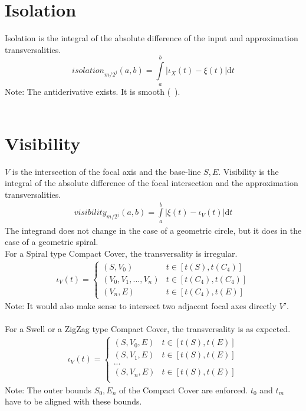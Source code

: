 \documentclass{report}
\begin{document}
\section{Isolation}
Isolation is the integral of the absolute difference of the input and approximation transversalities.
\begin{equation}
isolation_{m/2^j}(a,b)=\int \limits _{a}^{b} \vert\iota_{X}(t)-\xi(t)\vert \mathrm{d}t
\end{equation}
Note: The antiderivative exists. It is smooth (~\cite[Riemann Integrable]{Widon}).\\\\

\section{Visibility}
$V$ is the intersection of the focal axis and the base-line $S,E$. Visibility is the integral of the absolute difference of the focal intersection and the approximation transversalities.
\begin{align}
visibility_{m/2^j}(a,b)= \int \limits _{a}^{b} \vert \xi(t)-\iota_{V}(t)\vert  \mathrm{d}t
\end{align}
The integrand does not change in the case of a geometric circle, but it does in the case of a geometric spiral.\\
For a Spiral type Compact Cover, the transversality is irregular.
\begin{align*}
\iota_{V}(t) =
\begin{cases}
(S,V_{0}) & t \in [t(S),t(C_{4})]\\
(V_{0},V_{1}, ... , V_{n}) & t \in [t(C_{4}),t(C_{4})]\\
(V_{n},E) & t \in [t(C_{4}),t(E)]
\end{cases}
\end{align*}
Note: It would also make sense to intersect two adjacent focal axes directly $V'$.\\\\
For a Swell or a ZigZag type Compact Cover, the transversality is as expected.
\begin{align*}
\iota_{V}(t) =
\begin{cases}
(S,V_{0},E) & t \in [t(S),t(E)]\\
(S,V_{1},E) & t \in [t(S),t(E)]\\
...\\
(S,V_{n},E) & t \in [t(S),t(E)]\\
\end{cases}
\end{align*}
Note: The outer bounds $S_{0},E_{n}$ of the Compact Cover are enforced. $t_{0}$ and $t_{m}$ have to be aligned with these bounds.
\end{document}
